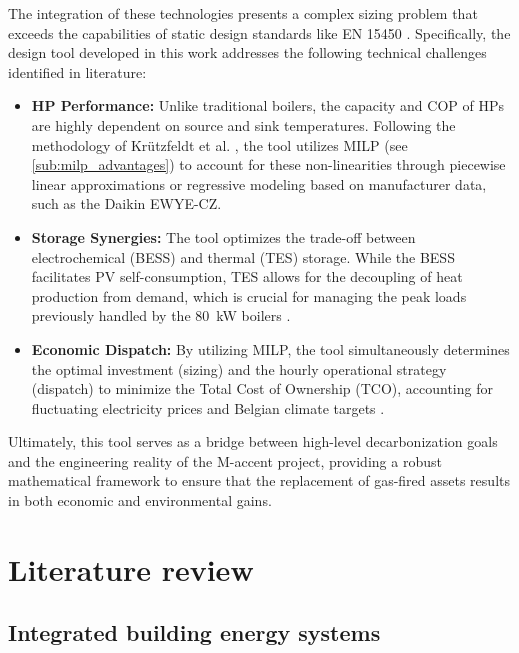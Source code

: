 \documentclass[11pt,a4paper]{report}
\begin{document}
The integration of these technologies presents a complex sizing problem that exceeds the capabilities of static design standards like EN 15450 \cite{EN15450_2007}. Specifically, the design tool developed in this work addresses the following technical challenges identified in literature:

\begin{itemize}
    \item \textbf{HP Performance:} Unlike traditional boilers, the capacity and COP of HPs are highly dependent on source and sink temperatures. Following the methodology of Krützfeldt et al. \cite{Krutzfeldt2021}, the tool utilizes MILP (see \autoref{sub:milp_advantages}) to account for these non-linearities through piecewise linear approximations or regressive modeling based on manufacturer data, such as the Daikin EWYE-CZ.
    
    \item \textbf{Storage Synergies:} The tool optimizes the trade-off between electrochemical (BESS) and thermal (TES) storage. While the BESS facilitates PV self-consumption, TES allows for the decoupling of heat production from demand, which is crucial for managing the peak loads previously handled by the 80~kW boilers \cite{Steen2015, Krien2020oemofsolph}.
    
    \item \textbf{Economic Dispatch:} By utilizing MILP, the tool simultaneously determines the optimal investment (sizing) and the hourly operational strategy (dispatch) to minimize the Total Cost of Ownership (TCO), accounting for fluctuating electricity prices and Belgian climate targets \cite{EU_Climate_Action_Belgium_2023}.
\end{itemize}

Ultimately, this tool serves as a bridge between high-level decarbonization goals and the engineering reality of the M-accent project, providing a robust mathematical framework to ensure that the replacement of gas-fired assets results in both economic and environmental gains.

\chapter{Literature review}
\label{literature review}



\section{Integrated building energy systems}
\label{sec:lit_building_systems}
\end{document}
